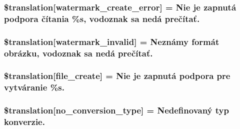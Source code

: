 \subsubsection[{\$translation}]{\setlength{\rightskip}{0pt plus 5cm}\$translation\mbox{[}\textquotesingle{}watermark\+\_\+create\+\_\+error\textquotesingle{}\mbox{]} = \textquotesingle{}Nie je zapnutá podpora čítania \%s, vodoznak sa nedá prečítať.\textquotesingle{}}\label{class_8upload_8sk___s_k_8php_aabca0b65dadbc6184415c16375f284ca}
\hypertarget{class_8upload_8sk___s_k_8php_ac336e7a5701e47ba4a05e9e498a3cc44}{}
\subsubsection[{\$translation}]{\setlength{\rightskip}{0pt plus 5cm}\$translation\mbox{[}\textquotesingle{}watermark\+\_\+invalid\textquotesingle{}\mbox{]} = \textquotesingle{}Neznámy formát obrázku, vodoznak sa nedá prečítať.\textquotesingle{}}\label{class_8upload_8sk___s_k_8php_ac336e7a5701e47ba4a05e9e498a3cc44}
\hypertarget{class_8upload_8sk___s_k_8php_a1ecb4673e4fb69e06b3f20b65cecf30a}{}
\subsubsection[{\$translation}]{\setlength{\rightskip}{0pt plus 5cm}\$translation\mbox{[}\textquotesingle{}file\+\_\+create\textquotesingle{}\mbox{]} = \textquotesingle{}Nie je zapnutá podpora pre vytváranie \%s.\textquotesingle{}}\label{class_8upload_8sk___s_k_8php_a1ecb4673e4fb69e06b3f20b65cecf30a}
\hypertarget{class_8upload_8sk___s_k_8php_a4712d7ec28e9a7f17eb3338af2358363}{}
\subsubsection[{\$translation}]{\setlength{\rightskip}{0pt plus 5cm}\$translation\mbox{[}\textquotesingle{}no\+\_\+conversion\+\_\+type\textquotesingle{}\mbox{]} = \textquotesingle{}Nedefinovaný typ konverzie.\textquotesingle{}}\label{class_8upload_8sk___s_k_8php_a4712d7ec28e9a7f17eb3338af2358363}
\hypertarget{class_8upload_8sk___s_k_8php_a783c9358bcf54a054545b50098bc679b}{}
